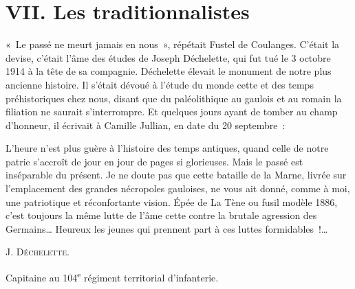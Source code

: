 \documentclass[french,twoside]{book} %
\newcommand\surname[1]{\textsc{#1}}
\newenvironment{quoteblock}%
  {\begin{quoting}}
  {\end{quoting}}
\newcommand\chapteropen{} %
\newcommand\chaptercont{} %
\newenvironment{quotebar}{%
    \def\FrameCommand{{\color{rubric!10!}\vrule width 0.5em} \hspace{0.9em}}%
    \def\OuterFrameSep{\itemsep} %
    \MakeFramed {\advance\hsize-\width \FrameRestore}
  }%
  {%
    \endMakeFramed
  }
\renewenvironment{quoteblock}%
  {%
    \savenotes
    \setstretch{0.9}
    \normalfont
    \begin{quotebar}
  }
  {%
    \end{quotebar}
    \spewnotes
  }
\begin{document}
\chapteropen
\chapter[VII. Les traditionnalistes]{VII. Les traditionnalistes}\renewcommand{\leftmark}{VII. Les traditionnalistes}


\chaptercont
\noindent « Le passé ne meurt jamais en nous », répétait Fustel de Coulanges. C’était la devise, c’était l’âme des études de Joseph Déchelette, qui fut tué le 3 octobre 1914 à la tête de sa compagnie. Déchelette élevait le monument de notre plus ancienne histoire. Il s’était dévoué à l’étude du monde cette et des temps préhistoriques chez nous, disant que du paléolithique au gaulois et au romain la filiation ne saurait s’interrompre. Et quelques jours ayant de tomber au champ d’honneur, il écrivait à Camille Jullian, en date du 20 septembre :‌\par

\begin{quoteblock}
 \noindent L’heure n’est plus guère à l’histoire des temps antiques, quand celle de notre patrie s’accroît de jour en jour de pages si glorieuses. Mais le passé est inséparable du présent. Je ne doute pas que cette bataille de la Marne, livrée sur l’emplacement des grandes nécropoles gauloises, ne vous ait donné, comme à moi, une patriotique et réconfortante vision. Épée de La Tène ou fusil modèle 1886, c’est toujours la même lutte de l’âme cette contre la brutale agression des Germains… Heureux les jeunes qui prennent part à ces luttes formidables !…‌\par
 \surname{J. Déchelette.}‌\par
 Capitaine au 104\textsuperscript{e} régiment territorial d’infanterie.‌
 \end{quoteblock}
\end{document}
